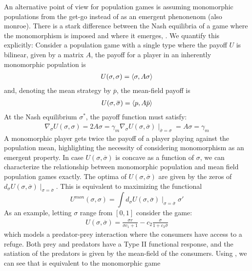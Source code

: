An alternative point of view for population games is assuming monomorphic populations from the get-go instead of as an emergent phenonenom \citep{various} (also monroe). There is a stark difference between the Nash equilibria of a game where the monomorphism is imposed and where it emerges, \citep{}. We quantify this explicitly: Consider a population game with a single type where the payoff $U$ is bilinear, given by a matrix $A$, the payoff for a player in an inherently monomorphic population is
\begin{align}
  U(\sigma,\sigma) = \left \langle \sigma,A\sigma \right \rangle
\end{align}
and, denoting the mean strategy by $\overbar{p}$, the mean-field payoff is
\begin{align}
  U(\sigma, \overbar{\sigma}) = \ip{p}{A\overbar{p}}
\end{align}
At the Nash equilibrium $\sigma^*$, the payoff function must satisfy:
\begin{align}
  \nabla_\sigma U(\sigma,\sigma) = 2A\sigma =\gamma_{m}
  \nabla_\sigma U(\sigma,\overbar{\sigma})\mid_{\overbar{\sigma} = \sigma} = A\sigma = \gamma_m
\end{align}
A monomorphic player gets twice the payoff of a player playing against the population mean, highlighting the necessity of considering monomorphism as an emergent property.
In case $U(\sigma, \overbar{\sigma})$ is concave as a function of $\sigma$, we can characterize the relationship between monomorphic population and mean field population games exactly. The optima of $U(\sigma,\overbar{\sigma})$ are given by the zeros of $d_{\sigma} U(\sigma,\overbar{\sigma})\mid_{\sigma=\overbar{\sigma}}$. This is equivalent to maximizing the functional
\begin{equation}
  U^{mon}(\sigma,\sigma) = \int d_{\sigma} U(\sigma,\overbar{\sigma})\mid_{\sigma=\overbar{\sigma}} \sigma'
  \label{eq:correspondence}
\end{equation}
As an example, letting $\sigma$ range from $[0,1]$ consider the game:
\begin{align}
  U(\sigma,\overbar{\sigma}) = \frac{\sigma r}{\sigma c_1 + 1} - c_2\frac{\sigma}{1 + c_3\overbar{\sigma}}
  \label{eq:simple_mfg}
\end{align}
which models a predator-prey interaction where the consumers have access to a refuge. Both prey and predators have a Type II functional response, and the satiation of the predators is given by the mean-field of the consumers.
Using , we can see that  is equivalent to the monomorphic game
